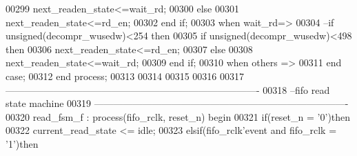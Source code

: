 \begin{DoxyCode}
00299             \textcolor{vhdlchar}{next_readen_state}\textcolor{vhdlchar}{<=}\textcolor{vhdlchar}{wait\_rd};
00300         \textcolor{keywordflow}{else}
00301             \textcolor{vhdlchar}{next_readen_state}\textcolor{vhdlchar}{<=}\textcolor{vhdlchar}{rd\_en}; 
00302         \textcolor{keywordflow}{end} \textcolor{keywordflow}{if};
00303       \textcolor{keywordflow}{when} \textcolor{vhdlchar}{wait\_rd}\textcolor{vhdlchar}{=}\textcolor{vhdlchar}{>}
00304 \textcolor{keyword}{                --if  unsigned(decompr\_wusedw)<254 then}
00305                 \textcolor{keywordflow}{if}  \textcolor{comment}{unsigned}\textcolor{vhdlchar}{(}\textcolor{vhdlchar}{decompr_wusedw}\textcolor{vhdlchar}{)}\textcolor{vhdlchar}{<}\textcolor{vhdllogic}{}\textcolor{vhdllogic}{498} \textcolor{keywordflow}{then}  
00306                     \textcolor{vhdlchar}{next_readen_state}\textcolor{vhdlchar}{<=}\textcolor{vhdlchar}{rd\_en};    
00307                 \textcolor{keywordflow}{else}
00308                     \textcolor{vhdlchar}{next_readen_state}\textcolor{vhdlchar}{<=}\textcolor{vhdlchar}{wait\_rd};
00309                 \textcolor{keywordflow}{end} \textcolor{keywordflow}{if};  
00310       \textcolor{keywordflow}{when} \textcolor{keywordflow}{others} \textcolor{vhdlchar}{=}\textcolor{vhdlchar}{>} 
00311       \textcolor{keywordflow}{end} \textcolor{keywordflow}{case};
00312 \textcolor{keywordflow}{end} \textcolor{keywordflow}{process}; 
00313 
00314 
00315 
00316 
00317 \textcolor{keyword}{-------------------------------------------------------------------------------}
00318 \textcolor{keyword}{--fifo read state machine}
00319 \textcolor{keyword}{-------------------------------------------------------------------------------}
00320 read\_fsm\_f : \textcolor{keywordflow}{process}(fifo_rclk, reset_n) \textcolor{keywordflow}{begin}
00321     \textcolor{keywordflow}{if}\textcolor{vhdlchar}{(}\textcolor{vhdlchar}{reset_n} \textcolor{vhdlchar}{=} \textcolor{vhdlchar}{'}\textcolor{vhdllogic}{}\textcolor{vhdllogic}{0}\textcolor{vhdlchar}{'}\textcolor{vhdlchar}{)}\textcolor{keywordflow}{then}
00322         \textcolor{vhdlchar}{current_read_state} \textcolor{vhdlchar}{<=} \textcolor{vhdlchar}{idle};
00323     \textcolor{keywordflow}{elsif}\textcolor{vhdlchar}{(}\textcolor{vhdlchar}{fifo_rclk}\textcolor{vhdlchar}{'}\textcolor{vhdlkeyword}{event} \textcolor{keywordflow}{and} \textcolor{vhdlchar}{fifo_rclk} \textcolor{vhdlchar}{=} \textcolor{vhdlchar}{'}\textcolor{vhdllogic}{}\textcolor{vhdllogic}{1}\textcolor{vhdlchar}{'}\textcolor{vhdlchar}{)}\textcolor{keywordflow}{then} 

\end{DoxyCode}
